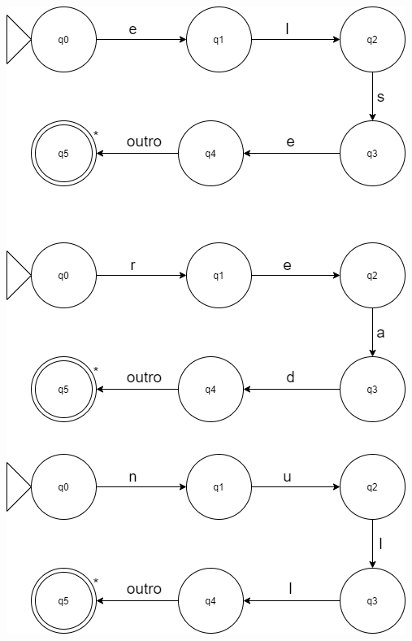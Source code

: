\documentclass[
	12pt,				%
	openright,			%
	twoside,			%
	a4paper,			%
	english,			%
	french,				%
	spanish,			%
	brazil				%
	]{abntex2}
\begin{document}
\includegraphics[scale=0.7]{7.png}
\\
\end{document}
